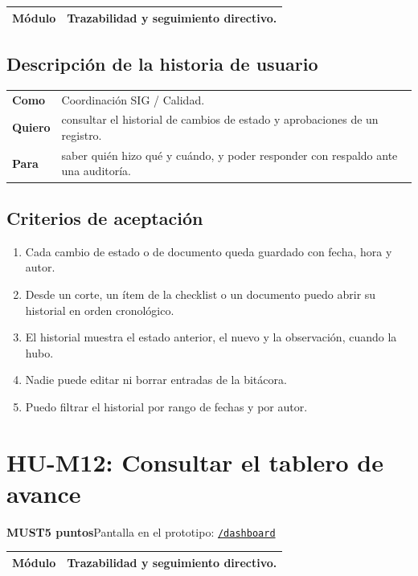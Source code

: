 \documentclass[11pt]{article}
\newcommand{\urlapp}{https://thankstochatgpt.github.io/LOARD}
\newcommand{\app}[1]{\href{\urlapp#1}{\texttt{#1}}}
\newcommand{\etiqueta}[1]{\colorbox{barra}{\textbf{\color{marca}#1}}}
\begin{document}
\begin{tabular}{>{\bfseries}p{2.4cm} p{13.4cm}}
\toprule
Módulo & Trazabilidad y seguimiento directivo. \\
\bottomrule
\end{tabular}

\subsection*{Descripción de la historia de usuario}

\begin{tabular}{>{\bfseries}p{2.4cm} p{13.4cm}}
\toprule
Como & Coordinación SIG / Calidad. \\
Quiero & consultar el historial de cambios de estado y aprobaciones de un registro. \\
Para & saber quién hizo qué y cuándo, y poder responder con respaldo ante una auditoría. \\
\bottomrule
\end{tabular}

\subsection*{Criterios de aceptación}

\begin{enumerate}
\item Cada cambio de estado o de documento queda guardado con fecha, hora y autor.
\item Desde un corte, un ítem de la checklist o un documento puedo abrir su historial en orden cronológico.
\item El historial muestra el estado anterior, el nuevo y la observación, cuando la hubo.
\item Nadie puede editar ni borrar entradas de la bitácora.
\item Puedo filtrar el historial por rango de fechas y por autor.
\end{enumerate}


\newpage
\section*{HU-M12: Consultar el tablero de avance}
\etiqueta{MUST}\quad\etiqueta{5 puntos}\quad Pantalla en el prototipo: \app{/dashboard}

\begin{tabular}{>{\bfseries}p{2.4cm} p{13.4cm}}
\toprule
Módulo & Trazabilidad y seguimiento directivo. \\
\bottomrule
\end{tabular}
\end{document}
